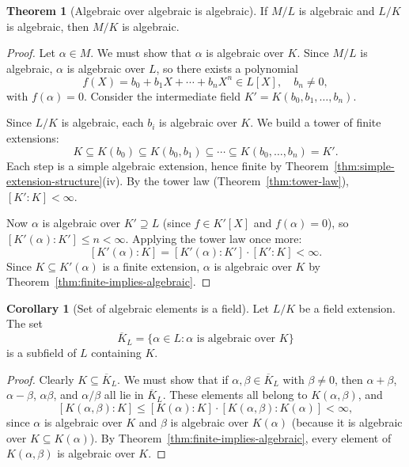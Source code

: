 \documentclass[12pt,a4paper,openany]{book}
\theoremstyle{definition}
\newtheorem{theorem}{Theorem}[chapter]
\newtheorem{corollary}{Corollary}[chapter]
\theoremstyle{remark}
\begin{document}
\begin{theorem}[Algebraic over algebraic is algebraic]
\label{thm:algebraic-tower}
If $M/L$ is algebraic and $L/K$ is algebraic, then $M/K$ is algebraic.
\end{theorem}

\begin{proof}
Let $\alpha \in M$. We must show that $\alpha$ is algebraic over $K$.
Since $M/L$ is algebraic, $\alpha$ is algebraic over $L$, so there
exists a polynomial
\[
  f(X) = b_0 + b_1 X + \cdots + b_n X^n \in L[X], \quad b_n \ne 0,
\]
with $f(\alpha) = 0$. Consider the intermediate field
$K' = K(b_0, b_1, \dots, b_n)$.

Since $L/K$ is algebraic, each $b_i$ is algebraic over $K$. We
build a tower of finite extensions:
\[
  K \subseteq K(b_0) \subseteq K(b_0, b_1) \subseteq \cdots
  \subseteq K(b_0, \dots, b_n) = K'.
\]
Each step is a simple algebraic extension, hence finite by
Theorem~\ref{thm:simple-extension-structure}(iv). By the tower law
(Theorem~\ref{thm:tower-law}), $[K':K] < \infty$.

Now $\alpha$ is algebraic over $K' \supseteq L$ (since
$f \in K'[X]$ and $f(\alpha) = 0$), so
$[K'(\alpha):K'] \le n < \infty$. Applying the tower law once more:
\[
  [K'(\alpha) : K] = [K'(\alpha):K']\cdot[K':K] < \infty.
\]
Since $K \subseteq K'(\alpha)$ is a finite extension, $\alpha$ is
algebraic over $K$ by Theorem~\ref{thm:finite-implies-algebraic}.
\end{proof}

\begin{corollary}[Set of algebraic elements is a field]
\label{cor:algebraic-elements-field}
Let $L/K$ be a field extension. The set
\[
  \overline{K}_L = \{ \alpha \in L : \alpha \text{ is algebraic over }
  K \}
\]
is a subfield of $L$ containing $K$.
\end{corollary}

\begin{proof}
Clearly $K \subseteq \overline{K}_L$. We must show that if
$\alpha, \beta \in \overline{K}_L$ with $\beta \ne 0$, then
$\alpha + \beta$, $\alpha - \beta$, $\alpha\beta$, and
$\alpha/\beta$ all lie in $\overline{K}_L$. These elements all
belong to $K(\alpha, \beta)$, and
\[
  [K(\alpha,\beta):K] \le [K(\alpha):K]\cdot[K(\alpha,\beta):K(\alpha)]
  < \infty,
\]
since $\alpha$ is algebraic over $K$ and $\beta$ is algebraic over
$K(\alpha)$ (because it is algebraic over $K \subseteq K(\alpha)$).
By Theorem~\ref{thm:finite-implies-algebraic}, every element of
$K(\alpha,\beta)$ is algebraic over $K$.
\end{proof}
\end{document}
